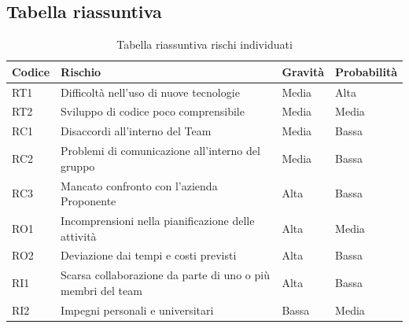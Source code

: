 \documentclass{article}
\begin{document}
    \subsection{Tabella riassuntiva}
    \begin{table}[h]
        \renewcommand{\arraystretch}{1.5}
        \centering
        \begin{tabular}{|p{1.5cm}|p{10cm}|p{2cm}|p{2cm}|}
            \hline
            \textbf{Codice} & \textbf{Rischio} & \textbf{Gravità} & \textbf{Probabilità} \\
            \hline
            RT1 & Difficoltà nell’uso di nuove tecnologie & Media & Alta \\
            \hline
            RT2 & Sviluppo di codice poco comprensibile & Media & Media \\
            \hline
            RC1 & Disaccordi all’interno del Team & Media & Bassa \\
            \hline
            RC2 & Problemi di comunicazione all’interno del gruppo & Media & Bassa \\
            \hline
            RC3 & Mancato confronto con l’azienda Proponente & Alta & Bassa \\
            \hline
            RO1 & Incomprensioni nella pianificazione delle attività & Alta & Media \\
            \hline
            RO2 & Deviazione dai tempi e costi previsti & Alta & Bassa \\
            \hline
            RI1 & Scarsa collaborazione da parte di uno o più membri del team & Alta & Bassa \\
            \hline
            RI2 & Impegni personali e universitari  & Bassa & Media \\
            \hline
        \end{tabular}
        \caption{Tabella riassuntiva rischi individuati}
    \end{table}







\newpage
\end{document}
